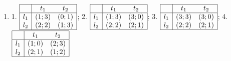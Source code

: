 \begin{problem}
\begin{enumerate}
\item	1.  $\begin{array}{|c|cc|}  \hline {} & {t_{1} } & {t_{2} } \\  \hline {l_{1} } & {\left(1;3\right)} & {\left(0;1\right)} \\ {l_{2} } & {\left(2;2\right)} & {\left(1;3\right)} \\  \hline  \end{array}$; 2.  $\begin{array}{|c|cc|}  \hline {} & {t_{1} } & {t_{2} } \\  \hline {l_{1} } & {\left(1;3\right)} & {\left(3;0\right)} \\ {l_{2} } & {\left(2;2\right)} & {\left(2;1\right)} \\  \hline  \end{array}$; 3.  $\begin{array}{|c|cc|}  \hline {} & {t_{1} } & {t_{2} } \\  \hline {l_{1} } & {\left(3;3\right)} & {\left(3;0\right)} \\ {l_{2} } & {\left(2;2\right)} & {\left(2;1\right)} \\  \hline  \end{array}$; 4.  $\begin{array}{|c|cc|}  \hline {} & {t_{1} } & {t_{2} } \\  \hline {l_{1} } & {\left(1;0\right)} & {\left(2;3\right)} \\ {l_{2} } & {\left(2;1\right)} & {\left(1;2\right)} \\  \hline  \end{array}$ \\

\end{enumerate}
\end{problem}
